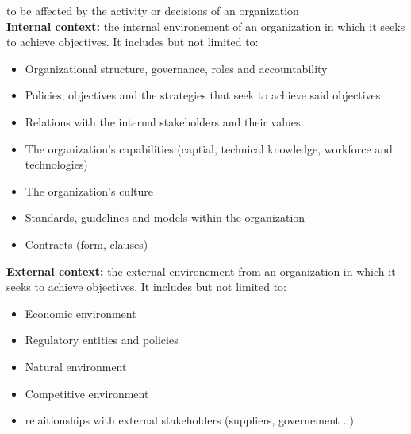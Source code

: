 \documentclass{article}
\begin{document}
to be affected by the activity or decisions of an organization\\
\textbf{Internal context:} the internal environement of an organization in which it seeks
to achieve objectives. It includes but not limited to:\\
\begin{itemize}
\item Organizational structure, governance, roles and accountability
\item Policies, objectives and the strategies that seek to achieve said objectives
\item Relations with the internal stakeholders and their values
\item The organization's capabilities (captial, technical knowledge, workforce and technologies)
\item The organization's culture
\item Standards, guidelines and models within the organization
\item Contracts (form, clauses)
\end{itemize}
\textbf{External context:} the external environement from an organization in which it seeks
to achieve objectives. It includes but not limited to: \\
\begin{itemize}
\item Economic environment
\item Regulatory entities and policies
\item Natural environment
\item Competitive environment
\item relaitionships with external stakeholders (suppliers, governement ..)
\end{itemize}
\end{document}
